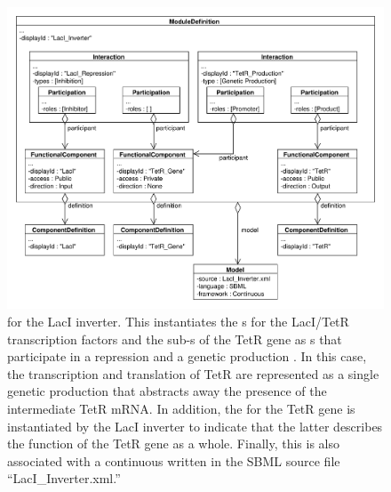 \begin{figure}[ht]
\begin{center}
\includegraphics[width=\textwidth]{example_uml/toggle_3}
\caption[]{ for the LacI inverter. This  instantiates the s for the LacI/TetR transcription factors and the sub-s of the TetR gene as s that participate in a repression  and a genetic production . In this case, the transcription and translation of TetR are represented as a single genetic production  that abstracts away the presence of the intermediate TetR mRNA. In addition, the  for the TetR gene is instantiated by the LacI inverter  to indicate that the latter describes the function of the TetR gene as a whole. Finally, this  is also associated with a continuous  written in the SBML source file ``LacI\_Inverter.xml.''}
\label{uml:ex_mod_def}
\end{center}
\end{figure}

